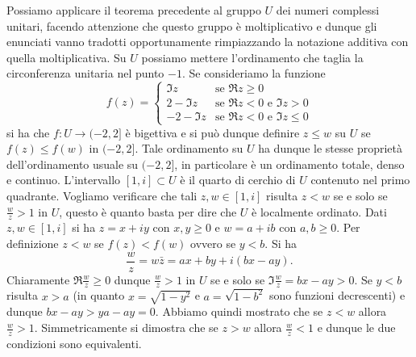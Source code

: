 Possiamo applicare il teorema precedente al gruppo 
$U$ dei numeri complessi unitari, facendo attenzione che questo gruppo 
è moltiplicativo e dunque gli enunciati vanno tradotti opportunamente 
rimpiazzando la notazione additiva con quella moltiplicativa.
Su $U$ possiamo mettere l'ordinamento che taglia la circonferenza 
unitaria nel punto $-1$.
Se consideriamo la funzione 
\[
  f(z) = \begin{cases}
    \Im z &\text{se $\Re z\ge 0$} \\
    2-\Im z&\text{se $\Re z<0$ e $\Im z>0$} \\
    -2-\Im z&\text{se $\Re z<0$ e $\Im z \le 0$} 
  \end{cases}  
\]
si ha che $f\colon U\to (-2,2]$ è bigettiva e si può dunque 
definire $z\le w$ su $U$ se $f(z)\le f(w)$ in $(-2,2]$.
Tale ordinamento su $U$ ha dunque le stesse proprietà 
dell'ordinamento usuale su $(-2,2]$, in particolare 
è un ordinamento totale, denso e continuo.
L'intervallo $[1,i]\subset U$ 
è il quarto di cerchio di $U$ contenuto nel primo quadrante.
Vogliamo verificare che tali $z,w\in [1,i]$ risulta 
$z<w$ se e solo se $\frac{w}{z} > 1$ in $U$, questo è quanto 
basta per dire che $U$ è localmente ordinato.
Dati $z,w \in[1,i]$ si ha $z=x+iy$ con $x,y\ge 0$ 
e $w=a+ib$ con $a,b\ge 0$. 
Per definizione $z<w$ se $f(z)<f(w)$ ovvero se $y<b$.
Si ha 
\[
  \frac w z = w \bar z = ax + by + i(bx - ay).  
\]
Chiaramente $\Re \frac w z\ge 0$ dunque $\frac w z > 1$ in 
$U$ se e solo se $\Im \frac w z = bx - ay > 0$.
Se $y<b$ risulta $x>a$ (in quanto $x=\sqrt{1-y^2}$ e $a=\sqrt{1-b^2}$
sono funzioni decrescenti) e dunque $bx - ay > ya - a y =0$.
Abbiamo quindi mostrato che se $z<w$ allora $\frac w z > 1$.
Simmetricamente si dimostra che se $z>w$ allora $\frac w z < 1$ 
e dunque le due condizioni sono equivalenti.

